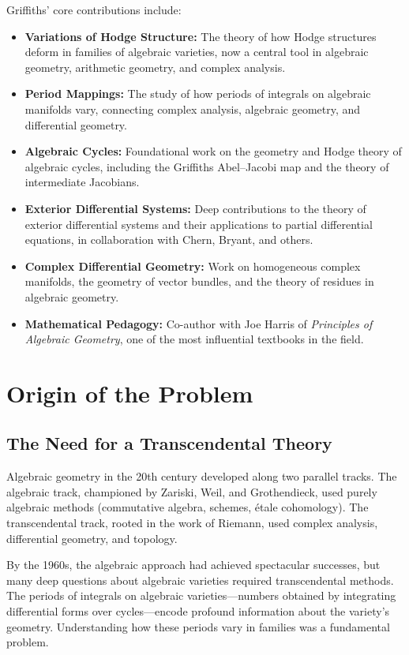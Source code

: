 Griffiths' core contributions include:
\begin{itemize}
    \item \textbf{Variations of Hodge Structure:} The theory of how Hodge structures deform in families of algebraic varieties, now a central tool in algebraic geometry, arithmetic geometry, and complex analysis.
    \item \textbf{Period Mappings:} The study of how periods of integrals on algebraic manifolds vary, connecting complex analysis, algebraic geometry, and differential geometry.
    \item \textbf{Algebraic Cycles:} Foundational work on the geometry and Hodge theory of algebraic cycles, including the Griffiths Abel--Jacobi map and the theory of intermediate Jacobians.
    \item \textbf{Exterior Differential Systems:} Deep contributions to the theory of exterior differential systems and their applications to partial differential equations, in collaboration with Chern, Bryant, and others.
    \item \textbf{Complex Differential Geometry:} Work on homogeneous complex manifolds, the geometry of vector bundles, and the theory of residues in algebraic geometry.
    \item \textbf{Mathematical Pedagogy:} Co-author with Joe Harris of \textit{Principles of Algebraic Geometry}, one of the most influential textbooks in the field.
\end{itemize}

\section{Origin of the Problem}

\subsection{The Need for a Transcendental Theory}

Algebraic geometry in the 20th century developed along two parallel tracks. The algebraic track, championed by Zariski, Weil, and Grothendieck, used purely algebraic methods (commutative algebra, schemes, \'etale cohomology). The transcendental track, rooted in the work of Riemann, used complex analysis, differential geometry, and topology.

By the 1960s, the algebraic approach had achieved spectacular successes, but many deep questions about algebraic varieties required transcendental methods. The periods of integrals on algebraic varieties---numbers obtained by integrating differential forms over cycles---encode profound information about the variety's geometry. Understanding how these periods vary in families was a fundamental problem.

